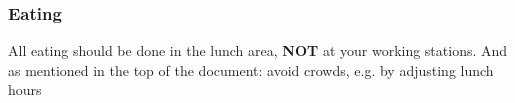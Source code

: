 \subsubsection*{Eating}

    All eating should be done in the lunch area, \textbf{NOT} at your working stations. And as mentioned in the top of the document: avoid crowds, e.g. by adjusting lunch hours